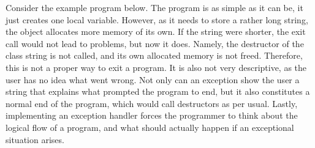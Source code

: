 Consider the example program below. The program is as simple as it can be, it just creates one local variable. However, as it needs to store a rather long string, the object allocates more memory of its own. If the string were shorter, the exit call would not lead to problems, but now it does. Namely, the destructor of the class string is not called, and its own allocated memory is not freed. Therefore, this is not a proper way to exit a program. It is also not very descriptive, as the user has no idea what went wrong. Not only can an exception show the user a string that explains what prompted the program to end, but it also constitutes a normal end of the program, which would call destructors as per usual. Lastly, implementing an exception handler forces the programmer to think about the logical flow of a program, and what should actually happen if an exceptional situation arises.
